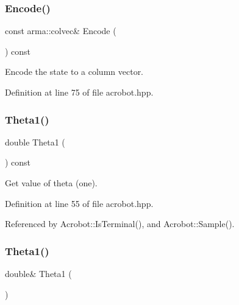 \subsubsection{Encode()}
{\footnotesize\ttfamily const arma\+::colvec\& Encode (\begin{DoxyParamCaption}{ }\end{DoxyParamCaption}) const\hspace{0.3cm}{\ttfamily [inline]}}



Encode the state to a column vector. 



Definition at line 75 of file acrobot.\+hpp.

\mbox{\label{classmlpack_1_1rl_1_1Acrobot_1_1State_afb4243a32fb34c0111c15cb02ec78244}} 
\subsubsection{Theta1()\hspace{0.1cm}{\footnotesize\ttfamily [1/2]}}
{\footnotesize\ttfamily double Theta1 (\begin{DoxyParamCaption}{ }\end{DoxyParamCaption}) const\hspace{0.3cm}{\ttfamily [inline]}}



Get value of theta (one). 



Definition at line 55 of file acrobot.\+hpp.



Referenced by Acrobot\+::\+Is\+Terminal(), and Acrobot\+::\+Sample().

\mbox{\label{classmlpack_1_1rl_1_1Acrobot_1_1State_af59cd0f9588fcdaab48215b82cb51977}} 
\subsubsection{Theta1()\hspace{0.1cm}{\footnotesize\ttfamily [2/2]}}
{\footnotesize\ttfamily double\& Theta1 (\begin{DoxyParamCaption}{ }\end{DoxyParamCaption})\hspace{0.3cm}{\ttfamily [inline]}}



